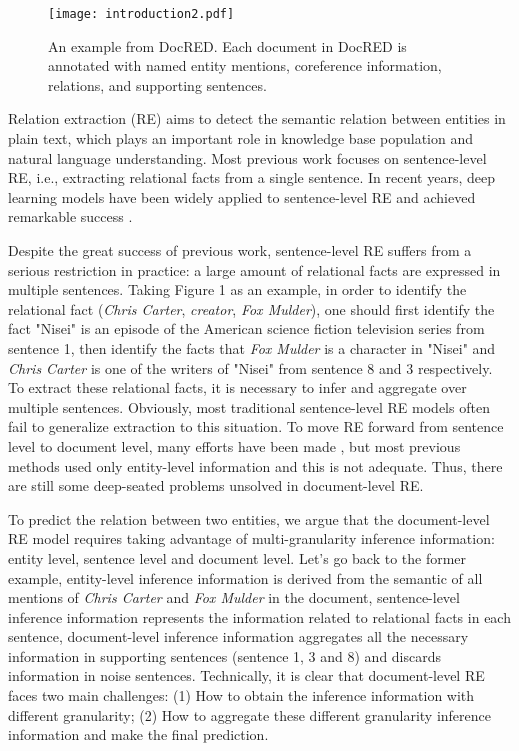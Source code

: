 \documentclass[runningheads]{llncs}
\begin{document}
\begin{figure}[ht]
	\centering
 	\texttt{[image: introduction2.pdf]}
	\protect\caption{An example from DocRED. Each document in DocRED is annotated with named entity mentions, coreference information, relations, and supporting sentences.
	}
	\label{Fig. 1}
\end{figure}
Relation extraction (RE) aims to detect the semantic relation between entities in plain text, which plays an important role in knowledge base population and natural language understanding.
Most previous work focuses on sentence-level RE, i.e., extracting relational facts from a single sentence.
In recent years, deep learning models
have been widely applied to sentence-level RE and achieved remarkable success \cite{han2018hierarchical,yu2019beyond}.

Despite the great success of previous work, sentence-level RE suffers from a serious restriction in practice: a large amount of relational facts are expressed in multiple sentences.
Taking Figure 1 as an example, in order to identify the relational fact (\emph{Chris Carter}, \emph{creator}, \emph{Fox Mulder}), one should first identify the fact "Nisei" is an episode of the American science fiction television series from sentence 1, then identify the facts that \emph{Fox Mulder} is a character in "Nisei" and \emph{Chris Carter} is one of the writers of "Nisei" from sentence 8 and 3 respectively.
To extract these relational facts, it is necessary to infer and aggregate over multiple sentences.
Obviously, most traditional sentence-level RE models often fail to generalize extraction to this situation.
To move RE forward from sentence level to document level, many efforts have been made \cite{wang2019fine,Yao2019DocREDAL},
but most previous methods used only entity-level information and this is not adequate.
Thus, there are still some deep-seated problems unsolved in document-level RE.

To predict the relation between two entities, we argue that the document-level RE model requires taking advantage of multi-granularity inference information: entity level, sentence level and document level.
Let’s go back to the former example, 
entity-level inference information is derived from the semantic of all mentions of \emph{Chris Carter} and \emph{Fox Mulder} in the document, 
sentence-level inference information represents the information related to relational facts in each sentence,
document-level inference information aggregates all the necessary information in supporting sentences (sentence 1, 3 and 8) and discards information in noise sentences.
Technically, it is clear that document-level RE faces two main challenges: 
(1) How to obtain the inference information with different granularity; 
(2) How to aggregate these different granularity inference information and make the final prediction.
\end{document}

